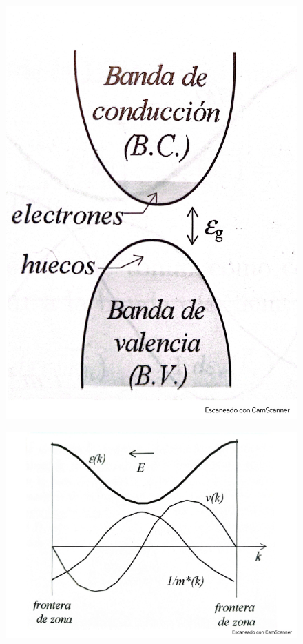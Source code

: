 \begin{figure}[h!] \centering
	\includegraphics[scale=0.5]{Cuerpo/Ch_08/Fotos libro 1.pdf}
	\caption{}
	\label{Fig:08-01}
\end{figure}
\begin{figure}[h!] \centering
	\includegraphics[scale=0.5]{Cuerpo/Ch_08/Fotos libro 2.pdf}
	\caption{}
	\label{Fig:08-02}
\end{figure}
